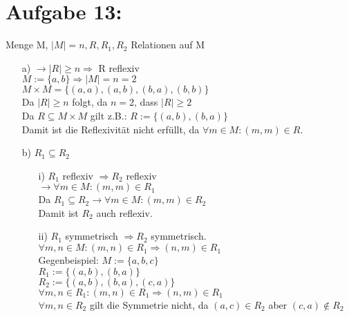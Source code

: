 \documentclass[paper = a4, ngerman]{scrartcl}
\begin{document}
\section*{Aufgabe 13:}

Menge M, $|M| = n, R, R_1, R_2 $ Relationen auf M\\

\begin{itemize}
	\item[a)]
		$\rightarrow |R| \ge n \Rightarrow $ R reflexiv\\
		$M := \{a,b\} \Rightarrow |M| = n = 2$\\
		$M \times M = \{(a,a),(a,b),(b,a),(b,b)\}$\\
		Da $|R| \ge n$ folgt, da $n = 2$, dass $|R| \ge 2$\\
		Da $R \subseteq M \times M$ gilt z.B.: $R := \{(a,b),(b,a)\}$\\
		Damit ist die Reflexivität nicht erfüllt, da $\forall m \in M : (m,m) \in R$.\\
	\item[b)]
		$R_1 \subseteq R_2$
		\begin{itemize}
			\item[i)]
				$R_1$ reflexiv $\Rightarrow R_2 $ reflexiv\\
				$\rightarrow \forall m \in M : (m,m) \in R_1$\\ Da $R_1 \subseteq R_2 \rightarrow \forall m \in M : (m,m) \in R_2$\\ Damit ist $R_2$ auch reflexiv.
			\item[ii)]
				$R_1 $ symmetrisch $\Rightarrow R_2 $ symmetrisch.\\
				$\forall m,n \in M : (m,n) \in R_1 \Rightarrow (n,m) \in R_1$\\
				Gegenbeispiel: $M := \{a,b,c\}$\\
				$R_1 := \{(a,b),(b,a)\}$\\
				$R_2 := \{(a,b),(b,a),(c,a)\}$\\
				$\forall m,n \in R_1 : (m,n) \in R_1 \Rightarrow (n,m) \in R_1$\\
				$\forall m,n \in R_2 $ gilt die Symmetrie nicht, da $(a,c) \in R_2$ aber $(c,a) \notin R_2 $\\
				

\end{itemize}
\end{itemize}
\end{document}

